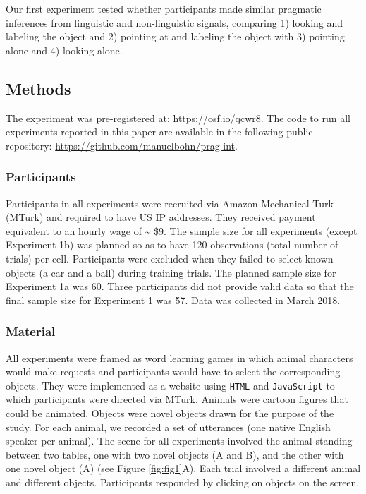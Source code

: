\documentclass[
  man,floatsintext]{apa6}
\begin{document}
Our first experiment tested whether participants made similar pragmatic inferences from linguistic and non-linguistic signals, comparing 1) looking and labeling the object and 2) pointing at and labeling the object with 3) pointing alone and 4) looking alone.

\hypertarget{methods}{%
\subsection{Methods}\label{methods}}

The experiment was pre-registered at: \url{https://osf.io/qcwr8}. The code to run all experiments reported in this paper are available in the following public repository: \url{https://github.com/manuelbohn/prag-int}.

\hypertarget{participants}{%
\subsubsection{Participants}\label{participants}}

Participants in all experiments were recruited via Amazon Mechanical Turk (MTurk) and required to have US IP addresses. They received payment equivalent to an hourly wage of \textasciitilde{} \$9. The sample size for all experiments (except Experiment 1b) was planned so as to have 120 observations (total number of trials) per cell. Participants were excluded when they failed to select known objects (a car and a ball) during training trials. The planned sample size for Experiment 1a was 60. Three participants did not provide valid data so that the final sample size for Experiment 1 was 57. Data was collected in March 2018.

\hypertarget{material}{%
\subsubsection{Material}\label{material}}

All experiments were framed as word learning games in which animal characters would make requests and participants would have to select the corresponding objects. They were implemented as a website using \texttt{HTML} and \texttt{JavaScript} to which participants were directed via MTurk. Animals were cartoon figures that could be animated. Objects were novel objects drawn for the purpose of the study. For each animal, we recorded a set of utterances (one native English speaker per animal). The scene for all experiments involved the animal standing between two tables, one with two novel objects (A and B), and the other with one novel object (A) (see Figure \ref{fig:fig1}A). Each trial involved a different animal and different objects. Participants responded by clicking on objects on the screen.
\end{document}
